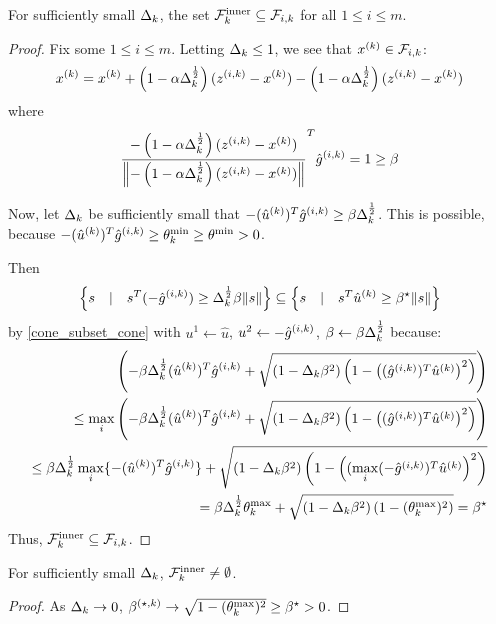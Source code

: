 \begin{theorem}
For sufficiently small $\Delta_k$, the set ${\mathcal {F}^{\text{inner}}_k} \subseteq {\mathcal F_{i, k}}$ for all $1\le i \le m$.
\end{theorem}


\begin{proof}
Fix some $1\le i \le m$.
Letting $\Delta_k \le 1$, we see that ${x^{(k)}} \in {\mathcal F_{i, k}}$:
\begin{align*}
{x^{(k)}} = {x^{(k)}} + \left(1 - \alpha\Delta_k^{\frac 1 2}\right)({z^{(i, k)}} - {x^{(k)}}) - \left(1 - \alpha\Delta_k^{\frac 1 2}\right)({z^{(i, k)}} - {x^{(k)}}) \\
\end{align*}
where
\begin{align*}
\frac{-\left(1 - \alpha\Delta_k^{\frac 1 2}\right)({z^{(i, k)}} - {x^{(k)}})}{\left\|-\left(1 - \alpha\Delta_k^{\frac 1 2}\right)({z^{(i, k)}} - {x^{(k)}})\right\|}^T{{\hat g}^{(i, k)}} = 1 \ge \beta\\
\end{align*}


Now, let $\Delta_k$ be sufficiently small that $-({{\hat u}^{(k)}})^T{{\hat g}^{(i, k)}} \ge \beta\Delta_k^{\frac 1 2}$.
This is possible, because $ -({{\hat u}^{(k)}})^T{{\hat g}^{(i, k)}} \ge \theta^{\text{min}}_k \ge \theta^{\text{min}} > 0$.

Then
\begin{align*}
\left\{s\quad | \quad s^T(-{{\hat g}^{(i, k)}})\ge\Delta_k^{\frac 1 2}\beta\|s\| \right\}  \subseteq \left\{s\quad | \quad s^T{{\hat u}^{(k)}}\ge\beta^{\star}\|s\| \right\}
\end{align*}
by \cref{cone_subset_cone} with $u^1 \gets \hat u$, $u^2 \gets -{{\hat g}^{(i, k)}}$, $\beta \gets \beta \Delta_k^{\frac 1 2 }$ because:
\begin{align*}
\left(-\beta\Delta_k^{\frac 1 2}({{\hat u}^{(k)}})^T{{\hat g}^{(i, k)}} + \sqrt{(1 - \Delta_k\beta^2)\left(1 - \left(({{\hat g}^{(i, k)}})^T\hat u^{(k)}\right)^2\right)}\right) \\
\le \max_i \left(-\beta\Delta_k^{\frac 1 2}({{\hat u}^{(k)}})^T{{{\hat g}^{(i, k)}}} + \sqrt{(1 - \Delta_k\beta^2)\left(1 - \left(({{\hat g}^{(i, k)}})^T{{\hat u}^{(k)}}\right)^2\right)}\right) \\
\le \beta\Delta_k^{\frac 1 2} \max_i\{-({{\hat u}^{(k)}})^T{{\hat g}^{(i, k)}}\} + \sqrt{(1 - \Delta_k\beta^2)\left(1 - \left((\max_i(-{{\hat g}^{(i, k)}})^T{{\hat u}^{(k)}}\right)^2\right)} \\
= \beta\Delta_k^{\frac 1 2} \theta^{\text{max}}_k + \sqrt{(1 - \Delta_k\beta^2)\left(1 - (\theta^{\text{max}}_k) ^2\right)} = \beta^{\star}
\end{align*}
Thus, ${\mathcal {F}^{\text{inner}}_k} \subseteq {\mathcal F_{i, k}}$.
\end{proof}

\begin{theorem}
For sufficiently small $\Delta_k$, ${\mathcal {F}^{\text{inner}}_k} \ne \emptyset$.
\end{theorem}
\begin{proof}
As $\Delta_k \to 0$, ${\beta^{(\star, k)}} \to \sqrt{1 - (\theta^{\text{max}}_k) ^2} \ge {\beta^{\star}} > 0$.
\end{proof}



